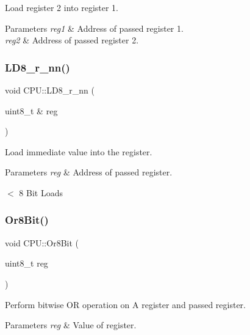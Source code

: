 Load register 2 into register 1. 


\begin{DoxyParams}{Parameters}
{\em reg1} & Address of passed register 1. \\
\hline
{\em reg2} & Address of passed register 2. \\
\hline
\end{DoxyParams}
\mbox{\label{classCPU_a5ab9827b65ff5a684cbc3ff01455ceaa}} 
\subsubsection{\texorpdfstring{L\+D8\+\_\+r\+\_\+nn()}{LD8\_r\_nn()}}
{\footnotesize\ttfamily void C\+P\+U\+::\+L\+D8\+\_\+r\+\_\+nn (\begin{DoxyParamCaption}\item[{uint8\+\_\+t \&}]{reg }\end{DoxyParamCaption})\hspace{0.3cm}{\ttfamily [private]}}



Load immediate value into the register. 


\begin{DoxyParams}{Parameters}
{\em reg} & Address of passed register.\\
\hline
\end{DoxyParams}
$<$ 8 Bit Loads \mbox{\label{classCPU_af04bdaa9d65413761e931886aabe7421}} 
\subsubsection{\texorpdfstring{Or8\+Bit()}{Or8Bit()}}
{\footnotesize\ttfamily void C\+P\+U\+::\+Or8\+Bit (\begin{DoxyParamCaption}\item[{uint8\+\_\+t}]{reg }\end{DoxyParamCaption})\hspace{0.3cm}{\ttfamily [private]}}



Perform bitwise OR operation on A register and passed register. 


\begin{DoxyParams}{Parameters}
{\em reg} & Value of register. \\
\hline
\end{DoxyParams}
\mbox{\label{classCPU_ab02cadc2eb9ff01c7132acef7ac5e4c3}} 
